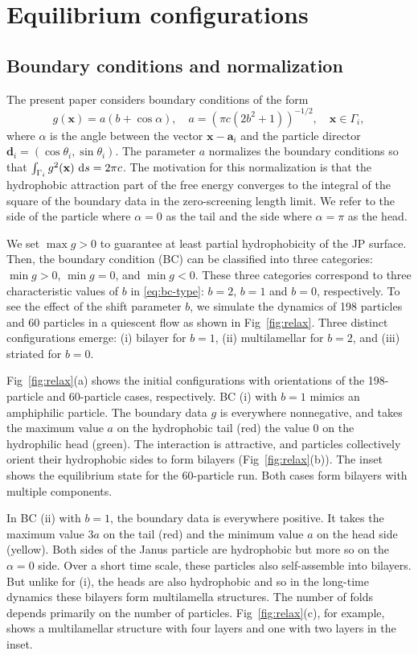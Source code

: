 \documentclass[prb,preprint,showpacs,preprintnumbers,amsmath,amssymb,longbibliography]{revtex4-1}
\renewcommand{\aa}{\mathbf{a}}
\newcommand{\dd}{\mathbf{d}}
\newcommand{\xx}{\mathbf{x}}
\begin{document}
\section{Equilibrium configurations}
\subsection{Boundary conditions and normalization}
The present paper considers boundary conditions of the form
\begin{equation}
  \label{eq:bc-type}
g(\xx) = a(b + \cos \alpha),\quad a = (\pi c(2b^2 + 1))^{-1/2},\quad \xx \in \Gamma_i,
\end{equation}
where $\alpha$ is the angle between the vector $\xx - \aa_i$ and 
the particle director $\dd_i = (\cos \theta_i, \sin \theta_i)$.
The parameter $a$ normalizes the boundary conditions 
so that $\int_{\Gamma_i} g^2(\xx) \, \dif s =  2\pi c$.
The motivation for this normalization is that the hydrophobic attraction
part of the free energy converges to the integral of the square of the boundary
data in the zero-screening length limit.  
We refer to the side of the particle where $\alpha = 0$
as the tail and the side where $\alpha = \pi$ as the head. 


We set $\max g>0$ to guarantee at least partial hydrophobicity of the JP surface.
Then, the boundary condition (BC) can be classified into
three categories: $\min g >0$, $\min g =0$, and $\min g <0$.  
These three categories correspond to three characteristic
values of $b$ in \eqref{eq:bc-type}: $b=2$, $b=1$ and $b=0$, respectively. 
%
To see the effect of the shift parameter $b$, we simulate the dynamics of
198 particles and 60 particles in a quiescent flow as shown in Fig~\ref{fig:relax}.
Three distinct configurations emerge:
(i) bilayer for $b = 1$, 
(ii) multilamellar for $b = 2$, and 
(iii) striated for $b = 0$.

Fig~\ref{fig:relax}(a) shows the initial configurations with
orientations of the 198-particle and 60-particle cases,
respectively. 
BC (i) with $b = 1$ mimics an amphiphilic particle.
The boundary data $g$ is everywhere nonnegative,
and takes
the maximum value $a$ on the hydrophobic tail (red)
the value $0$ on the hydrophilic head (green). 
The interaction is attractive, and particles collectively orient their
hydrophobic sides to form bilayers  (Fig~\ref{fig:relax}(b)). The inset shows the equilibrium 
state for the 60-particle run.
Both cases form bilayers with multiple components. 

In BC (ii) with $b = 1$, the boundary data is everywhere positive.
It takes the maximum value $3a$ on the tail (red) and the
minimum value $a$ on the head side (yellow). 
Both sides of the Janus particle are hydrophobic but
more so on the $\alpha = 0$ side.  
Over a short time scale, these particles also self-assemble into bilayers. But unlike for  (i),
the heads are also hydrophobic and so in the long-time dynamics
these bilayers form multilamella structures\cite{C9NR05885K}.
The number of folds depends primarily on the number of particles.
Fig~\ref{fig:relax}(c), for example, shows a
multilamellar structure with four layers and one with two layers in the inset.
\end{document}
